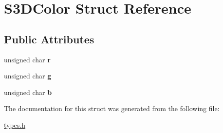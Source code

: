 \hypertarget{struct_s3_d_color}{
\section{S3DColor Struct Reference}
\label{struct_s3_d_color}
}
\subsection*{Public Attributes}
\begin{DoxyCompactItemize}
\item 
\hypertarget{struct_s3_d_color_a4a7329c346d7745fd46b81a5d1cac393}{
unsigned char {\bfseries r}}
\label{struct_s3_d_color_a4a7329c346d7745fd46b81a5d1cac393}

\item 
\hypertarget{struct_s3_d_color_a6f926b101765a5b848dfb5acdce1f1a4}{
unsigned char {\bfseries g}}
\label{struct_s3_d_color_a6f926b101765a5b848dfb5acdce1f1a4}

\item 
\hypertarget{struct_s3_d_color_af03f6858e55796ca988a17b15c2284b3}{
unsigned char {\bfseries b}}
\label{struct_s3_d_color_af03f6858e55796ca988a17b15c2284b3}

\end{DoxyCompactItemize}


The documentation for this struct was generated from the following file:\begin{DoxyCompactItemize}
\item 
\hyperlink{types_8h}{types.h}\end{DoxyCompactItemize}
